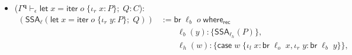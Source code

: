 \documentclass[acmsmall,screen,review]{acmart}
\newcommand{\mb}[1]{\ensuremath{\mathbf{#1}}}
\newcommand{\ms}[1]{\ensuremath{\mathsf{#1}}}
\newcommand{\lto}{:}
\newcommand{\linl}[1]{\iota_l\;{#1}}
\newcommand{\linr}[1]{\iota_r\;{#1}}
\newcommand{\letexpr}[3]{\ensuremath{\ms{let}\;#1 = #2;\;#3}}
\newcommand{\caseexpr}[5]{\ms{case}\;#1\;\{\linl{#2} \lto #3, \linr{#4} \lto #5\}}
\newcommand{\brb}[2]{\ms{br}\;#1\;#2}
\newcommand{\cwhere}[2]{#1\;\ms{where}_{\ms{rec}}\;#2}
\newcommand{\wbranch}[3]{#1(#2) \lto \{#3\}}
\newcommand{\liter}[3]{\ms{iter}\;#1\;\{ \linr{#2} \lto #3 \}}
\newcommand{\qsp}[4]{#1 \vdash #2 = #3 + #4}
\newcommand{\hasty}[4]{#1 \vdash_{#2} #3: {#4}}
\newcommand{\tossa}[2]{\ms{SSA}_{#1}(#2)}
\newcommand{\dnt}[1]{\llbracket{#1}\rrbracket}
\begin{document}
\begin{itemize}
\begin{align*}
          \dnt{\Gamma^{\mb{q}_3}} \otimes \dnt{\hasty{\Gamma^{\mb{q}_4}}{\epsilon}{o}{A + B}}
          ; \delta^{-1} ; [
          \dnt{\hasty{\Gamma^{\mb{q}_3}, y : A}{\epsilon}{P}{C}},
          \dnt{\hasty{\Gamma^{\mb{q}_3}, z : B}{\epsilon}{Q}{C}}
      \\ & \quad
      ])
      ; \dnt{\qsp{\Gamma^{\mb{q}_{12}}}{\mb{q}_1}{\mb{q}_1}{\mb{q}_2}} \otimes \dnt{C}
      ; \alpha
      ; \dnt{\Gamma^{\mb{q}_1}} \otimes \dnt{\hasty{\Gamma^{\mb{q}_2}, x : C}{\epsilon}{R}{D}}
      ; \iota_r
      \\
      &= \dnt{\qsp{\Gamma}{\mb{q}}{\mb{q}_{12}}{\mb{q}_{34}}} 
      ; \dnt{\qsp{\Gamma}{\mb{q}_{12}}{\mb{q}_1}{\mb{q}_2}} \otimes ( 
          \dnt{\qsp{\Gamma}{\mb{q}_{34}}{\mb{q}_3}{\mb{q}_4}} ;
          \dnt{\Gamma^{\mb{q}_3}} \otimes \dnt{\hasty{\Gamma^{\mb{q}_4}}{\epsilon}{o}{A + B}}
          ; \\ & \qquad \delta^{-1} ; [
          \dnt{\hasty{\Gamma^{\mb{q}_3}, y : A}{\epsilon}{P}{C}},
          \dnt{\hasty{\Gamma^{\mb{q}_3}, z : B}{\epsilon}{Q}{C}}
      ])
      ; \alpha
      ; \dnt{\Gamma^{\mb{q}_1}} \otimes \dnt{\hasty{\Gamma^{\mb{q}_2}, x : C}{\epsilon}{R}{D}}
      ; \iota_r
      \\
      &= \dnt{\qsp{\Gamma}{\mb{q}}{\mb{q}_{1}}{\mb{q}_{234}}}
      ; (\dnt{\Gamma^{\mb{q}_1}} \otimes (
          \dnt{\qsp{\Gamma}{\mb{q}_{234}}{\mb{q}_{2}}{\mb{q}_{34}}}  
          ; \\ & \qquad 
            \dnt{\Gamma^{\mb{q}_2}} 
            \otimes (\dnt{\hasty{\Gamma^{\mb{q}_{34}}}{\epsilon}{\caseexpr{o}{y}{P}{z}{Q}}{C}}
          ; \dnt{\hasty{\Gamma^{\mb{q}_2}, x : C}{\epsilon}{R}{D}}
      ))) 
      ; \iota_r
      \\
      &= \dnt{\qsp{\Gamma}{\mb{q}}{\mb{q}_{1}}{\mb{q}_{234}}}
      ; \dnt{\Gamma^{\mb{q}_1}} \otimes \dnt{
        \hasty{\Gamma^{\mb{q}_{234}}}{\epsilon}{\letexpr{x}{\caseexpr{o}{y}{P}{z}{Q}}{R}}{D}
      } ; \iota_r
  \end{align*}
  as desired.
  \item ($\hasty{\Gamma^{\mb{q}}}{\epsilon}{\letexpr{x}{\liter{o}{x}{P}}{Q}}{C}$): 
  \begin{align*}
    (\tossa{\ell}{\letexpr{x}{\liter{o}{y}{P}}{Q}})
    & := \cwhere{\brb{\ell_b}{o}}{ \\ & \qquad
      \wbranch{\ell_b}{y}{\tossa{\ell_h}{P}}, \\ & \qquad
      \wbranch{\ell_h}{w}{\caseexpr{w}{x}{\brb{\ell_o}{x}}{y}{\brb{\ell_b}{y}}}, \\ & \qquad
}
\end{align*}
\end{itemize}
\end{document}
